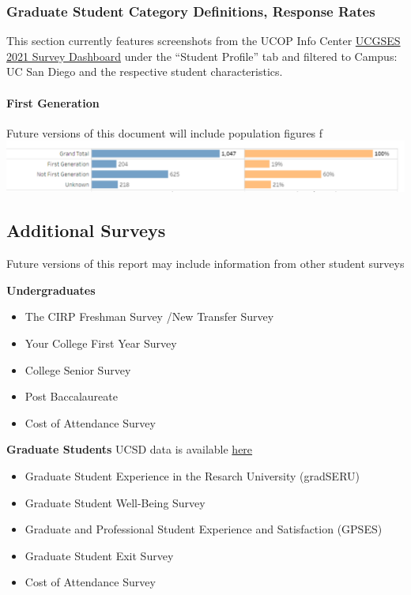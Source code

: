 \documentclass[
  letterpaper,
  DIV=11,
  numbers=noendperiod]{scrreprt}
\let\oldparagraph\paragraph
\renewcommand{\paragraph}[1]{\oldparagraph{#1}\mbox{}}
\begin{document}
\hypertarget{graduate-student-category-definitions-response-rates}{%
\subsubsection{Graduate Student Category Definitions, Response
Rates}\label{graduate-student-category-definitions-response-rates}}

This section currently features screenshots from the UCOP Info Center
\href{https://www.universityofcalifornia.edu/about-us/information-center/UCGSES-survey}{UCGSES
2021 Survey Dashboard} under the ``Student Profile'' tab and filtered to
Campus: UC San Diego and the respective student characteristics.

\hypertarget{first-generation}{%
\paragraph{First Generation}\label{first-generation}}

Future versions of this document will include population figures f
\includegraphics{./viz/intro/ucgses_first_gen.png}

\hypertarget{additional-surveys}{%
\subsection{Additional Surveys}\label{additional-surveys}}

Future versions of this report may include information from other
student surveys

\textbf{Undergraduates}

\begin{itemize}
\item
  The CIRP Freshman Survey /New Transfer Survey
\item
  Your College First Year Survey
\item
  College Senior Survey
\item
  Post Baccalaureate
\item
  Cost of Attendance Survey
\end{itemize}

\textbf{Graduate Students} UCSD data is available
\href{https://grad.ucsd.edu/about/grad-data/surveys/index.html}{here}

\begin{itemize}
\item
  Graduate Student Experience in the Resarch University (gradSERU)
\item
  Graduate Student Well-Being Survey
\item
  Graduate and Professional Student Experience and Satisfaction (GPSES)
\item
  Graduate Student Exit Survey
\item
  Cost of Attendance Survey
\end{itemize}
\end{document}
